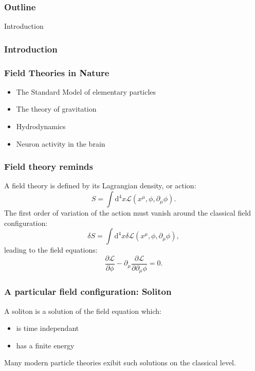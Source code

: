 \begin{frame}
  \frametitle{Outline}
  \tableofcontents
\end{frame}

\begin{section}{Introduction}
  \begin{frame}
    \frametitle{Introduction}
  \end{frame}

  \begin{frame}
    \frametitle{Field Theories in Nature}
    \begin{itemize}
    \item The Standard Model of elementary particles
    \item The theory of gravitation
    \item Hydrodynamics
    \item Neuron activity in the brain
    \end{itemize}
  \end{frame}

  \begin{frame}
    \frametitle{Field theory reminds}
    A field theory is defined by its Lagrangian density, or action:
    \begin{equation*}
      S = \int\mathrm d^4 x \mathcal L(x^\mu,\phi, \partial_\mu\phi).
    \end{equation*}
    The first order of variation of the action must vanish around the
    classical field configuration:
    \begin{equation*}
      \delta S = \int\mathrm d^4 x\delta\mathcal L(x^\mu,\phi, \partial_\mu\phi),
    \end{equation*}
    leading to the field equations:
    \begin{equation*}
      \frac{\partial \mathcal L}{\partial \phi}-\partial_\mu\frac{\partial\mathcal L}{\partial\partial_\mu\phi}=0.
    \end{equation*}
    \end{frame}

    \begin{frame}
      \frametitle{A particular field configuration: Soliton}
      A soliton is a solution of the field equation which:
      \begin{itemize}
      \item is time independant
      \item has a finite energy
      \end{itemize}
      Many modern particle theories exibit such solutions on the
      classical level.


\end{frame}
\end{section}
